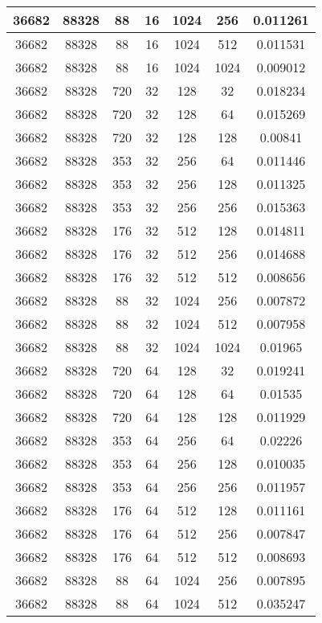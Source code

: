 \documentclass[9pt]{article}
\begin{document}
\begin{tabular}{|c|c|c|c|c|c|c| }
\hline
36682  & 88328  & 88  & 16  & 1024  & 256  & 0.011261 \\
\hline
36682  & 88328  & 88  & 16  & 1024  & 512  & 0.011531 \\
\hline
36682  & 88328  & 88  & 16  & 1024  & 1024  & 0.009012 \\
\hline
36682  & 88328  & 720  & 32  & 128  & 32  & 0.018234 \\
\hline
36682  & 88328  & 720  & 32  & 128  & 64  & 0.015269 \\
\hline
36682  & 88328  & 720  & 32  & 128  & 128  & 0.00841 \\
\hline
36682  & 88328  & 353  & 32  & 256  & 64  & 0.011446 \\
\hline
36682  & 88328  & 353  & 32  & 256  & 128  & 0.011325 \\
\hline
36682  & 88328  & 353  & 32  & 256  & 256  & 0.015363 \\
\hline
36682  & 88328  & 176  & 32  & 512  & 128  & 0.014811 \\
\hline
36682  & 88328  & 176  & 32  & 512  & 256  & 0.014688 \\
\hline
36682  & 88328  & 176  & 32  & 512  & 512  & 0.008656 \\
\hline
36682  & 88328  & 88  & 32  & 1024  & 256  & 0.007872 \\
\hline
36682  & 88328  & 88  & 32  & 1024  & 512  & 0.007958 \\
\hline
36682  & 88328  & 88  & 32  & 1024  & 1024  & 0.01965 \\
\hline
36682  & 88328  & 720  & 64  & 128  & 32  & 0.019241 \\
\hline
36682  & 88328  & 720  & 64  & 128  & 64  & 0.01535 \\
\hline
36682  & 88328  & 720  & 64  & 128  & 128  & 0.011929 \\
\hline
36682  & 88328  & 353  & 64  & 256  & 64  & 0.02226 \\
\hline
36682  & 88328  & 353  & 64  & 256  & 128  & 0.010035 \\
\hline
36682  & 88328  & 353  & 64  & 256  & 256  & 0.011957 \\
\hline
36682  & 88328  & 176  & 64  & 512  & 128  & 0.011161 \\
\hline
36682  & 88328  & 176  & 64  & 512  & 256  & 0.007847 \\
\hline
36682  & 88328  & 176  & 64  & 512  & 512  & 0.008693 \\
\hline
36682  & 88328  & 88  & 64  & 1024  & 256  & 0.007895 \\
\hline
36682  & 88328  & 88  & 64  & 1024  & 512  & 0.035247 \\

\end{tabular}
\end{document}
